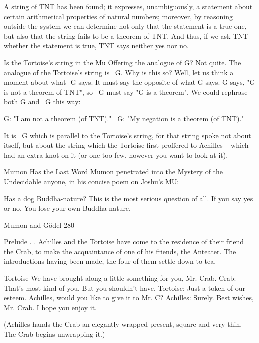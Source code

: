    A string of TNT has been found; it expresses, unambiguously, a statement about
   certain arithmetical properties of natural numbers; moreover, by reasoning outside
   the system we can determine not only that the statement is a true one, but also that
   the string fails to be a theorem of TNT. And thus, if we ask TNT whether the
   statement is true, TNT says neither yes nor no.

       Is the Tortoise's string in the Mu Offering the analogue of G? Not quite. The
analogue of the Tortoise's string is ~G. Why is this so? Well, let us think a moment about
what -G says. It must say the opposite of what G says. G says, "G is not a theorem of
TNT", so ~G must say "G is a theorem". We could rephrase both G and ~G this way:

       G: "I am not a theorem (of TNT)."
       ~G: "My negation is a theorem (of TNT)."

It is ~G which is parallel to the Tortoise's string, for that string spoke not about itself, but
about the string which the Tortoise first proffered to Achilles -- which had an extra knot
on it (or one too few, however you want to look at it).

                             Mumon Has the Last Word
Mumon penetrated into the Mystery of the Undecidable anyone, in his concise poem on
Joshu's MU:

       Has a dog Buddha-nature?
       This is the most serious question of all.
       If you say yes or no,
       You lose your own Buddha-nature.




Mumon and Gödel                                                                            280

                                     Prelude . .
   Achilles and the Tortoise have come to the residence of their friend the Crab, to
   make the acquaintance of one of his friends, the Anteater. The introductions
   having been made, the four of them settle down to tea.

Tortoise We have brought along a little something for you, Mr. Crab. Crab: That's most
   kind of you. But you shouldn't have.
Tortoise: Just a token of our esteem. Achilles, would you like to give it to Mr. C?
Achilles: Surely. Best wishes, Mr. Crab. I hope you enjoy it.

   (Achilles hands the Crab an elegantly wrapped present, square and very thin. The
   Crab begins unwrapping it.)


